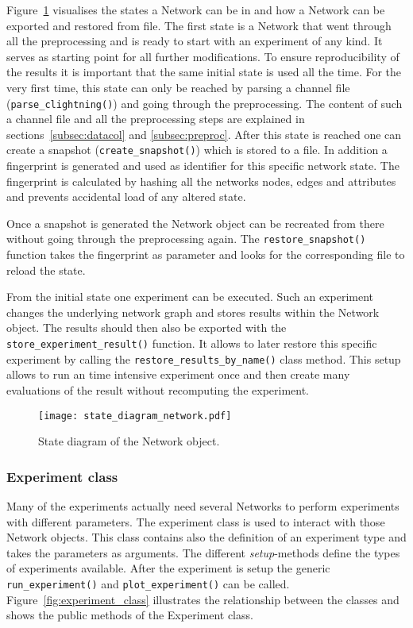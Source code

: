 \documentclass[final]{fhnwreport}       %
\begin{document}
Figure~\ref{fig:state_network} visualises the states a Network can be in and how a Network can be exported and restored from file. The first state is a Network that went through all the preprocessing and is ready to start with an experiment of any kind. It serves as starting point for all further modifications. To ensure reproducibility of the results it is important that the same initial state is used all the time. For the very first time, this state can only be reached by parsing a channel file (\texttt{parse_clightning()}) and going through the preprocessing. The content of such a channel file and all the preprocessing steps are explained in sections~\ref{subsec:datacol} and \ref{subsec:preproc}. After this state is reached one can create a snapshot (\texttt{create_snapshot()}) which is stored to a file. In addition a fingerprint is generated and used as identifier for this specific network state. The fingerprint is calculated by hashing all the networks nodes, edges and attributes and prevents accidental load of any altered state.

Once a snapshot is generated the Network object can be recreated from there without going through the preprocessing again. The \texttt{restore_snapshot()} function takes the fingerprint as parameter and looks for the corresponding file to reload the state. 

From the initial state one experiment can be executed. Such an experiment changes the underlying network graph and stores results within the Network object. The results should then also be exported with the \texttt{store_experiment_result()} function. It allows to later restore this specific experiment by calling the \texttt{restore_results_by_name()} class method. This setup allows to run an time intensive experiment once and then create many evaluations of the result without recomputing the experiment. 

\begin{figure}[H]
\centering
\texttt{[image: state\_diagram\_network.pdf]}
\caption{State diagram of the Network object.}
\label{fig:state_network}
\end{figure}

\subsubsection{Experiment class}
Many of the experiments actually need several Networks to perform experiments with different parameters. The experiment class is used to interact with those Network objects. This class contains also the definition of an experiment type and takes the parameters as arguments. The different \textit{setup}-methods define the types of experiments available. After the experiment is setup the generic \texttt{run_experiment()} and \texttt{plot_experiment()} can be called. Figure~\ref{fig:experiment_class} illustrates the relationship between the classes and shows the public methods of the Experiment class.
\end{document}
